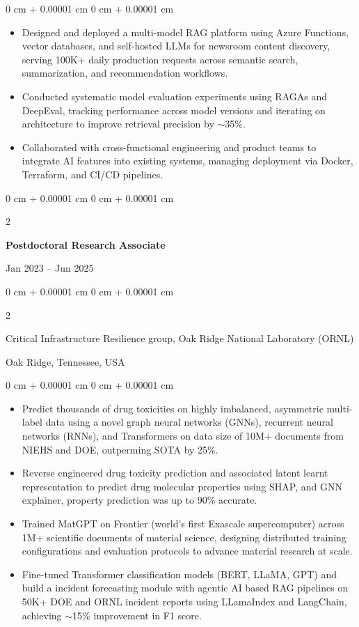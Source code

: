 \documentclass[10pt, letterpaper]{article}
\newenvironment{highlights}{
    \begin{itemize}[
        topsep=0.10 cm,
        parsep=0.10 cm,
        partopsep=0pt,
        itemsep=0pt,
        leftmargin=0 cm + 10pt
    ]
}{
    \end{itemize}
} %
\newenvironment{onecolentry}{
    \begin{adjustwidth}{
        0 cm + 0.00001 cm
    }{
        0 cm + 0.00001 cm
    }
}{
    \end{adjustwidth}
} %
\newenvironment{twocolentry}[2][]{
    \onecolentry
    \def\secondColumn{#2}
    \setcolumnwidth{\fill, 4.5 cm}
    \begin{paracol}{2}
}{
    \switchcolumn \raggedleft \secondColumn
    \end{paracol}
    \endonecolentry
} %
\begin{document}
    \begin{onecolentry}
        \begin{highlights}
            \item Designed and deployed a multi-model RAG platform using Azure Functions, vector databases, and self-hosted LLMs for newsroom content discovery, serving 100K+ daily production requests across semantic search, summarization, and recommendation workflows.
            \item Conducted systematic model evaluation experiments using RAGAs and DeepEval, tracking performance across model versions and iterating on architecture to improve retrieval precision by $\sim$35\%.
            \item Collaborated with cross-functional engineering and product teams to integrate AI features into existing systems, managing deployment via Docker, Terraform, and CI/CD pipelines.
        \end{highlights}
    \end{onecolentry}

    \vspace{1mm}

    \begin{twocolentry}{Jan 2023 -- Jun 2025}
        \textbf{Postdoctoral Research Associate}
    \end{twocolentry}
    \begin{twocolentry}{Oak Ridge, Tennessee, USA}
        Critical Infrastructure Resilience group, Oak Ridge National Laboratory (ORNL)
    \end{twocolentry}
    \vspace{0.10 cm}
    \begin{onecolentry}
        \begin{highlights}
            \item Predict thousands of drug toxicities on highly imbalanced, asymmetric multi-label data using a novel graph neural networks (GNNs), recurrent neural networks (RNNs), and Transformers on data size of 10M+ documents from NIEHS and DOE, outperming SOTA by 25\%.
            \item Reverse engineered drug toxicity prediction and associated latent learnt representation to predict drug molecular properties using SHAP, and GNN explainer, property prediction was up to 90\% accurate.
            \item Trained MatGPT on Frontier (world’s first Exascale supercomputer) across 1M+ scientific documents of material science, designing distributed training configurations and evaluation protocols to advance material research at scale.
            \item Fine-tuned Transformer classification models (BERT, LLaMA, GPT) and build a incident forecasting module with agentic AI  based RAG pipelines on 50K+ DOE and ORNL incident reports using LLamaIndex and LangChain, achieving $\sim$15\% improvement in F1 score.
            
        \end{highlights}
    \end{onecolentry}
\end{document}
